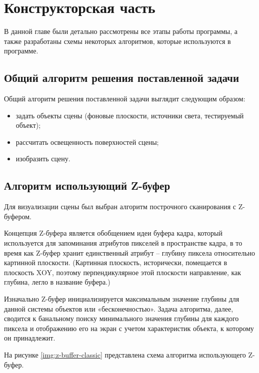 \chapter{Конструкторская часть}

В данной главе были детально рассмотрены все этапы работы программы, а также разработаны схемы некоторых алгоритмов, которые используются в программе.

\section{Общий алгоритм решения поставленной задачи}

Общий алгоритм решения поставленной задачи выглядит следующим образом:
\begin{itemize}
	\item задать объекты сцены (фоновые плоскости, источники света, тестируемый объект);
	\item рассчитать освещенность поверхностей сцены;
	\item изобразить сцену.
\end{itemize}

\section{Алгоритм использующий Z-буфер}

Для визуализации сцены был выбран алгоритм построчного сканирования с Z-буфером.

Концепция Z-буфера является обобщением идеи буфера кадра, который используется для запоминания атрибутов пикселей в пространстве кадра, в то время как Z-буфер хранит единственный атрибут – глубину пиксела относительно картинной плоскости. (Картинная плоскость, исторически, помещается в плоскость XOY, поэтому перпендикулярное этой плоскости направление, как глубина, легло в название буфера.) 

Изначально Z-буфер инициализируется максимальным значение глубины для данной системы объектов или «бесконечностью». Задача алгоритма, далее, сводится к банальному поиску минимального значения глубины для каждого пиксела и отображению его на экран с учетом характеристик объекта, к которому он принадлежит.

На рисунке \ref{img:z-buffer-classic} представлена схема алгоритма использующего Z-буфер.


